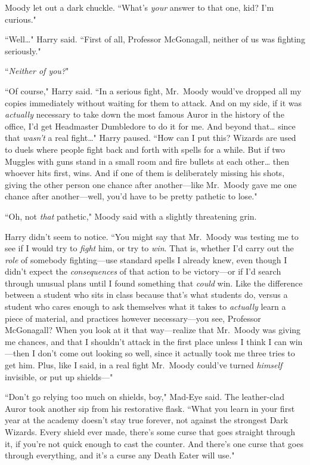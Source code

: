 Moody let out a dark chuckle. ``What's \emph{your} answer to that one, kid? I'm curious."

``Well{\ldots}" Harry said. ``First of all, Professor McGonagall, neither of us was fighting seriously."

``\emph{Neither of you?}"

``Of course," Harry said. ``In a serious fight, Mr.~Moody would've dropped all my copies immediately without waiting for them to attack. And on my side, if it was \emph{actually} necessary to take down the most famous Auror in the history of the office, I'd get Headmaster Dumbledore to do it for me. And beyond that{\ldots} since that \emph{wasn't} a real fight{\ldots}" Harry paused. ``How can I put this? Wizards are used to duels where people fight back and forth with spells for a while. But if two Muggles with guns stand in a small room and fire bullets at each other{\ldots} then whoever hits first, wins. And if one of them is deliberately missing his shots, giving the other person one chance after another—like Mr.~Moody gave me one chance after another—well, you'd have to be pretty pathetic to lose."

``Oh, not \emph{that} pathetic," Moody said with a slightly threatening grin.

Harry didn't seem to notice. ``You might say that Mr.~Moody was testing me to see if I would try to \emph{fight} him, or try to \emph{win}. That is, whether I'd carry out the \emph{role} of somebody fighting—use standard spells I already knew, even though I didn't expect the \emph{consequences} of that action to be victory—or if I'd search through unusual plans until I found something that \emph{could} win. Like the difference between a student who sits in class because that's what students do, versus a student who cares enough to ask themselves what it takes to \emph{actually} learn a piece of material, and practices however necessary—you see, Professor McGonagall? When you look at it that way—realize that Mr.~Moody was giving me chances, and that I shouldn't attack in the first place unless I think I can win—then I don't come out looking so well, since it actually took me three tries to get him. Plus, like I said, in a real fight Mr.~Moody could've turned \emph{himself} invisible, or put up shields—"

``Don't go relying too much on shields, boy," Mad-Eye said. The leather-clad Auror took another sip from his restorative flask. ``What you learn in your first year at the academy doesn't stay true forever, not against the strongest Dark Wizards. Every shield ever made, there's some curse that goes straight through it, if you're not quick enough to cast the counter. And there's one curse that goes through everything, and it's a curse any Death Eater will use."

